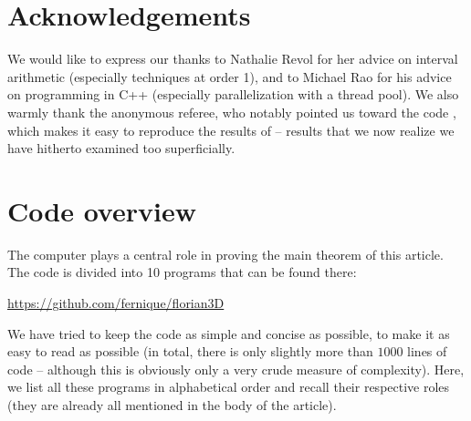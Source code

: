\documentclass[11pt]{article}
\begin{document}
\section*{Acknowledgements}

We would like to express our thanks to Nathalie Revol for her advice on interval arithmetic (especially techniques at order 1), and to Michael Rao for his advice on programming in C++ (especially parallelization with a thread pool).
We also warmly thank the anonymous referee, who notably pointed us toward the code \cite{Lei25}, which makes it easy to reproduce the results of \cite{Lov14} -- results that we now realize we have hitherto examined too superficially.

\appendix

\section{Code overview}
\label{sec:code}

The computer plays a central role in proving the main theorem of this article.
The code is divided into 10 programs that can be found there:
\begin{center}
\url{https://github.com/fernique/florian3D}
\end{center}
We have tried to keep the code as simple and concise as possible, to make it as easy to read as possible (in total, there is only slightly more than $1000$ lines of code -- although this is obviously only a very crude measure of complexity).
Here, we list all these programs in alphabetical order and recall their respective roles (they are already all mentioned in the body of the article).
\end{document}
